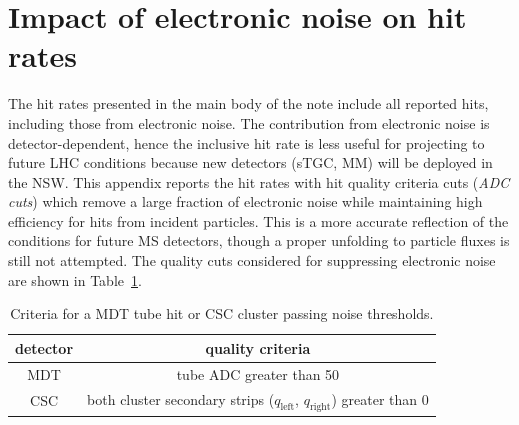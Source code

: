 \section{Impact of electronic noise on hit rates}
\label{sec:electronicnoise}

The hit rates presented in the main body of the note include all reported hits, including those from electronic noise. The contribution from electronic noise is detector-dependent, hence the inclusive hit rate is less useful for projecting to future LHC conditions because new detectors (sTGC, MM) will be deployed in the NSW. This appendix reports the hit rates with hit quality criteria cuts (\textit{ADC cuts}) which remove a large fraction of electronic noise while maintaining high efficiency for hits from incident particles. This is a more accurate reflection of the conditions for future MS detectors, though a proper unfolding to particle fluxes is still not attempted. The quality cuts considered for suppressing electronic noise are shown in Table~\ref{tab:electronic-adc}.

\begin{table}
  \begin{center}
    \begin{tabular}{c|c}
      detector & quality criteria \\
      \hline
      MDT      & tube ADC greater than 50 \\
      CSC      & both cluster secondary strips ($q_\text{left}$, $q_\text{right}$) greater than 0 \\
    \end{tabular}
    \caption{Criteria for a MDT tube hit or CSC cluster passing noise thresholds.}
    \label{tab:electronic-adc}
  \end{center}
\end{table}

